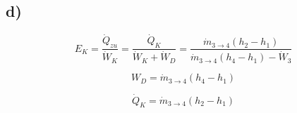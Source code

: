 

\subsection*{d)}
\begin{equation*}
    E_K = \frac{\dot{Q}_{zu}}{\dot{W}_K} = \frac{\dot{Q}_K}{\dot{W}_K + \dot{W}_D} = \frac{\dot{m}_{3\to4}(h_2 - h_1)}{\dot{m}_{3\to4}(h_4 - h_1) - \dot{W}_3}
\end{equation*}

\begin{equation*}
    W_D = \dot{m}_{3\to4}(h_4 - h_1)
\end{equation*}

\begin{equation*}
    \dot{Q}_K = \dot{m}_{3\to4}(h_2 - h_1)
\end{equation*}